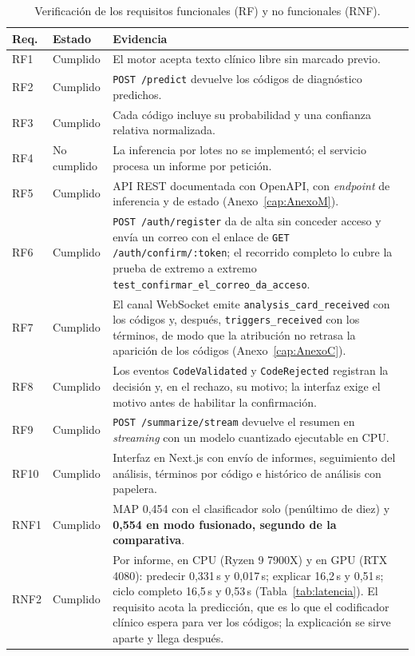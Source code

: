 \begin{table}[h]
\centering
\small
\caption{Verificación de los requisitos funcionales (RF) y no funcionales (RNF).}
\label{tab:verificacion-req}
\begin{tabular}{llp{7.2cm}}
\hline
\textbf{Req.} & \textbf{Estado} & \textbf{Evidencia} \\
\hline
RF1 & Cumplido & El motor acepta texto clínico libre sin marcado previo. \\
RF2 & Cumplido & \texttt{POST /predict} devuelve los códigos de diagnóstico predichos. \\
RF3 & Cumplido & Cada código incluye su probabilidad y una confianza relativa normalizada. \\
RF4 & No cumplido & La inferencia por lotes no se implementó; el servicio procesa un informe por petición. \\
RF5 & Cumplido & API REST documentada con OpenAPI, con \emph{endpoint} de inferencia y de estado (Anexo~\ref{cap:AnexoM}). \\
\hline
RF6 & Cumplido & \texttt{POST /auth/register} da de alta sin conceder acceso y envía un correo con el enlace de \texttt{GET /auth/confirm/:token}; el recorrido completo lo cubre la prueba de extremo a extremo \texttt{test\_confirmar\_el\_correo\_da\_acceso}. \\
RF7 & Cumplido & El canal WebSocket emite \texttt{analysis\_card\_received} con los códigos y, después, \texttt{triggers\_received} con los términos, de modo que la atribución no retrasa la aparición de los códigos (Anexo~\ref{cap:AnexoC}). \\
RF8 & Cumplido & Los eventos \texttt{CodeValidated} y \texttt{CodeRejected} registran la decisión y, en el rechazo, su motivo; la interfaz exige el motivo antes de habilitar la confirmación. \\
RF9 & Cumplido & \texttt{POST /summarize/stream} devuelve el resumen en \emph{streaming} con un modelo cuantizado ejecutable en CPU. \\
RF10 & Cumplido & Interfaz en Next.js con envío de informes, seguimiento del análisis, términos por código e histórico de análisis con papelera. \\
\hline
RNF1 & Cumplido & MAP 0,454 con el clasificador solo (penúltimo de diez) y \textbf{0,554 en modo fusionado, segundo de la comparativa}. \\
RNF2 & Cumplido & Por informe, en CPU (Ryzen 9 7900X) y en GPU (RTX 4080): predecir 0,331\,s y 0,017\,s; explicar 16,2\,s y 0,51\,s; ciclo completo 16,5\,s y 0,53\,s (Tabla~\ref{tab:latencia}). El requisito acota la predicción, que es lo que el codificador clínico espera para ver los códigos; la explicación se sirve aparte y llega después. \\

\end{tabular}
\end{table}
